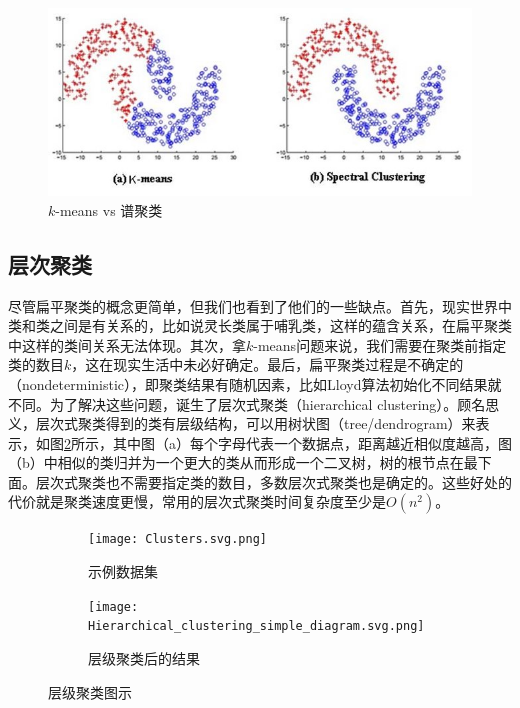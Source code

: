 \begin{figure}[h]
    \includegraphics[scale=0.4]{pic/Comparison-between-K-Means-and-spectral-clustering_W640.jpg}
    \caption{$k$-means vs 谱聚类}
    \label{fig: flat_compare}
\end{figure}

\subsection{层次聚类}
尽管扁平聚类的概念更简单，但我们也看到了他们的一些缺点。首先，现实世界中类和类之间是有关系的，比如说灵长类属于哺乳类，这样的蕴含关系，在扁平聚类中这样的类间关系无法体现。其次，拿$k$-means问题来说，我们需要在聚类前指定类的数目$k$，这在现实生活中未必好确定。最后，扁平聚类过程是不确定的（nondeterministic），即聚类结果有随机因素，比如Lloyd算法初始化不同结果就不同。为了解决这些问题，诞生了层次式聚类（hierarchical clustering）。顾名思义，层次式聚类得到的类有层级结构，可以用树状图（tree/dendrogram）来表示，如图\ref{fig: hierarchical}所示，其中图（a）每个字母代表一个数据点，距离越近相似度越高，图（b）中相似的类归并为一个更大的类从而形成一个二叉树，树的根节点在最下面。层次式聚类也不需要指定类的数目，多数层次式聚类也是确定的。这些好处的代价就是聚类速度更慢，常用的层次式聚类时间复杂度至少是$O(n^2)$。

\begin{figure}[h]
    \begin{subfigure}{.38\linewidth}
        \texttt{[image: Clusters.svg.png]}
        \caption{示例数据集}
    \end{subfigure}
    \hfil
    \begin{subfigure}{.47\linewidth}
        \texttt{[image: Hierarchical\_clustering\_simple\_diagram.svg.png]}
        \caption{层级聚类后的结果}
    \end{subfigure}
    \caption{层级聚类图示}
    \label{fig: hierarchical}
\end{figure}


